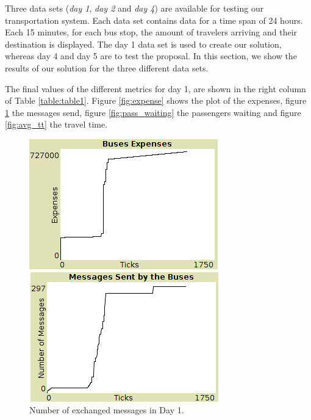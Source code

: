 Three data sets (\textit{day 1}, \textit{day 2} and \textit{day 4}) are available for testing our transportation system. Each data set contains data for a time span of 24 hours. Each 15 minutes, for each bus stop, the amount of travelers arriving and their destination is displayed. The day 1 data set is used to create our solution, whereas day 4 and day 5 are to test the proposal. In this section, we show the results of our solution for the three different data sets.

The final values of the different metrics for day 1, are shown in the right column of Table \ref{table:table1}. Figure \ref{fig:expense} shows the plot of the expenses, figure \ref{fig:messages} the messages send, figure \ref{fig:pass_waiting} the passengers waiting and figure \ref{fig:avg_tt} the travel time.

\begin{figure}[htbp]
\centering
\begin{minipage}{.48\textwidth}
  \includegraphics[width=\textwidth]{src/expenses.png}
  \caption{Expenses of the buses in Day 1.}
  \label{fig:expense}
\end{minipage}
\begin{minipage}{.48\textwidth}
  \includegraphics[width=\textwidth]{src/nr_messages.png}
  \caption{Number of exchanged messages in Day 1.}
  \label{fig:messages}
\end{minipage}
\end{figure}

